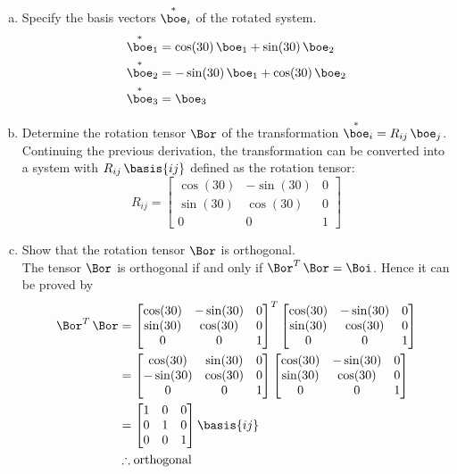 \documentclass[a4paper,twosided,11pt,DIV15]{scrartcl}
\begin{document}
\begin{enumerate}[(a)]
\item  Specify the basis vectors $\boea_i$ of the rotated system.
  \begin{align*}
    \boea_1 &= \cos(30)\,\boe_1 + \sin(30)\,\boe_2\\
    \boea_2 &= -\sin(30)\,\boe_1 + \cos(30)\,\boe_2\\
    \boea_3 &= \boe_3
  \end{align*}
\item Determine the rotation tensor $\Bor$ of the transformation
  $\boea_i=R_{ij}\,\boe_j$.\\
Continuing the previous derivation, the transformation can be
converted into a system with $R_{ij}\,\basis{ij}$ defined as the rotation tensor:
$$ R_{ij} = 
\begin{bmatrix}
  \cos(30) & -\sin(30) & 0 \\
  \sin(30) & \cos(30) & 0 \\
  0 & 0 & 1
\end{bmatrix}
$$
\item Show that the rotation tensor $\Bor$ is orthogonal.
\\ The tensor $\Bor$ is orthogonal if and only if $\Bor^T\,\Bor = \Boi$. Hence
it can be proved by
\begin{align*}
\Bor^T\,\Bor&=
\begin{bmatrix}
  \cos(30) & -\sin(30) & 0 \\
  \sin(30) & \cos(30) & 0 \\
  0 & 0 & 1
\end{bmatrix}^T
\begin{bmatrix}
  \cos(30) & -\sin(30) & 0 \\
  \sin(30) & \cos(30) & 0 \\
  0 & 0 & 1
\end{bmatrix}\\
&=
\begin{bmatrix}
  \cos(30) & \sin(30) & 0 \\
  -\sin(30) & \cos(30) & 0 \\
  0 & 0 & 1
\end{bmatrix}
\begin{bmatrix}
  \cos(30) & -\sin(30) & 0 \\
  \sin(30) & \cos(30) & 0 \\
  0 & 0 & 1
\end{bmatrix}
\\&=
\begin{bmatrix}
  1 & 0 & 0\\
  0 & 1 & 0\\
  0 & 0 & 1
\end{bmatrix} \basis{ij}\\
& \therefore \textrm{orthogonal}
\end{align*}

\end{enumerate}
\end{document}
